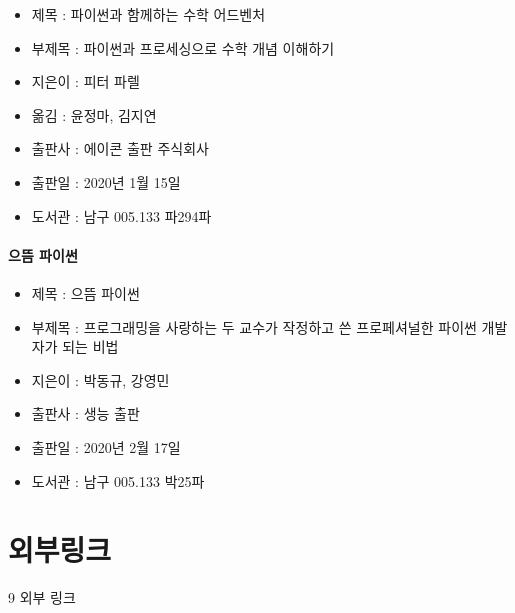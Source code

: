 \documentclass[12pt, a4paper, oneside]{book}
\let\stdsection\section
\renewcommand\section{\newpage\stdsection}
\begin{document}
\begin{itemize}[					
		topsep=0.0em,			
		parsep=0.0em,			
		itemsep=0em,			
		leftmargin=	3	em,
		labelwidth=	1	em,			
		labelsep=		1	 em			
]					
	\item	제목 	: 파이썬과 함께하는 수학 어드벤처 
	\item	부제목 	: 파이썬과 프로세싱으로 수학 개념 이해하기
	\item	지은이 	: 피터 파렐
	\item	옮김 	: 윤정마, 김지연
	\item	출판사 	:  에이콘 출판 주식회사
	\item	출판일 	:	2020년 1월 15일 
	\item	도서관 	: 남구  005.133 파294파

\end{itemize}					



\paragraph{으뜸 파이썬 }

\begin{itemize}[					
		topsep=0.0em,			
		parsep=0.0em,			
		itemsep=0em,			
		leftmargin=	3	em,
		labelwidth=	1	em,			
		labelsep=		1	 em			
]					
	\item	제목 	: 으뜸 파이썬 
	\item	부제목 	: 프로그래밍을 사랑하는 두 교수가 작정하고 쓴 프로페셔널한 파이썬 개발자가 되는 비법
	\item	지은이 	: 박동규, 강영민
	\item	출판사 	: 생능 출판
	\item	출판일 	:	2020년 2월 17일 
	\item	도서관 	: 남구  005.133 박25파
\end{itemize}					



	\section{ 외부링크}

9	외부 링크











\end{document}
